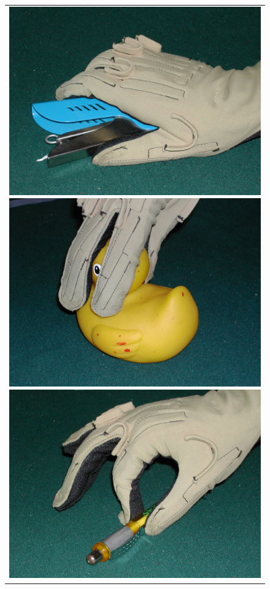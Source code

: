 \begin{figure}[!ht]
\begin{center}
\begin{tabular}{c}
      \includegraphics[height=0.08\textheight]{figs/grasping/grasp2.jpg}
      \includegraphics[height=0.08\textheight]{figs/grasping/grasp3.jpg}
      \includegraphics[height=0.08\textheight]{figs/grasping/grasp4.jpg}

\end{tabular}
\end{center}
\end{figure}
